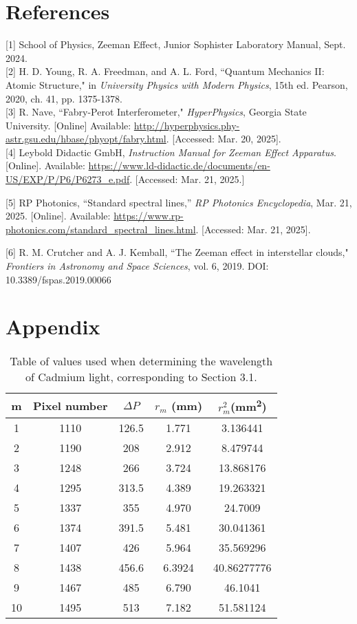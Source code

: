 \documentclass[11pt,twocolumn, a4paper]{article}
\numberwithin{equation}{section} %
\numberwithin{figure}{section} %
\numberwithin{table}{section} %
\begin{document}
\section{References}
[1] School of Physics, Zeeman Effect, Junior Sophister Laboratory Manual, Sept. 2024. \\ 

[2] H. D. Young, R. A. Freedman, and A. L. Ford, ``Quantum Mechanics II: Atomic Structure," in \textit{University Physics with Modern Physics}, 15th ed. Pearson, 2020, ch. 41, pp. 1375-1378. \\

[3] R. Nave, ``Fabry-Perot Interferometer," \textit{HyperPhysics}, Georgia State University. [Online] Available: \url{http://hyperphysics.phy-astr.gsu.edu/hbase/phyopt/fabry.html}. [Accessed: Mar. 20, 2025]. \\

[4] Leybold Didactic GmbH, \textit{Instruction Manual for Zeeman Effect Apparatus}. [Online]. Available: \url{https://www.ld-didactic.de/documents/en-US/EXP/P/P6/P6273_e.pdf}. [Accessed: Mar. 21, 2025.]

[5] RP Photonics,     ``Standard spectral lines,” \textit{RP Photonics Encyclopedia}, Mar. 21, 2025. [Online]. Available: \url{https://www.rp-photonics.com/standard_spectral_lines.html}. [Accessed: Mar. 21, 2025]. 

[6] R. M. Crutcher and A. J. Kemball, ``The Zeeman effect in interstellar clouds," \textit{Frontiers in Astronomy and Space Sciences}, vol. 6, 2019. DOI: 10.3389/fspas.2019.00066

\section{Appendix}
\begin{table}[H]
    \caption{Table of values used when determining the wavelength of Cadmium light, corresponding to Section 3.1.}
    \centering
    \renewcommand{\arraystretch}{1.2}
    \begin{tabular}{ccccc}
        \hline
        m & Pixel number & \(\Delta P\) & \(r_m\) (mm) & \(r_m^2\)(mm\textsuperscript{2})} \\
        \hline
        1  & 1110 & 126.5  & 1.771  & 3.136441 \\
        2  & 1190 & 208    & 2.912  & 8.479744 \\
        3  & 1248 & 266    & 3.724  & 13.868176 \\
        4  & 1295 & 313.5  & 4.389  & 19.263321 \\
        5  & 1337 & 355    & 4.970  & 24.7009 \\
        6  & 1374 & 391.5  & 5.481  & 30.041361 \\
        7  & 1407 & 426    & 5.964  & 35.569296 \\
        8  & 1438 & 456.6  & 6.3924 & 40.86277776 \\
        9  & 1467 & 485    & 6.790  & 46.1041 \\
        10 & 1495 & 513    & 7.182  & 51.581124 \\
        \hline
    \end{tabular}
    \label{tab:experiment1}
\end{table}
\end{document}
